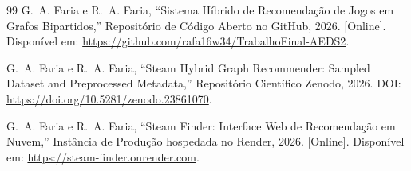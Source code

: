 \documentclass[conference]{IEEEtran}
\begin{document}
\begin{thebibliography}{99}
G.~A. Faria e R.~A. Faria, ``Sistema Híbrido de Recomendação de Jogos em Grafos Bipartidos,'' Repositório de Código Aberto no GitHub, 2026. [Online]. Disponível em: \url{https://github.com/rafa16w34/TrabalhoFinal-AEDS2}.

G.~A. Faria e R.~A. Faria, ``Steam Hybrid Graph Recommender: Sampled Dataset and Preprocessed Metadata,'' Repositório Científico Zenodo, 2026. DOI: \url{https://doi.org/10.5281/zenodo.23861070}.

G.~A. Faria e R.~A. Faria, ``Steam Finder: Interface Web de Recomendação em Nuvem,'' Instância de Produção hospedada no Render, 2026. [Online]. Disponível em: \url{https://steam-finder.onrender.com}.

\end{thebibliography}
\end{document}
